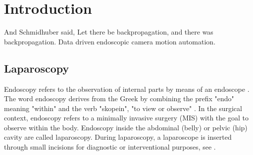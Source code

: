 \chapter[Introduction]{Introduction}
\label{chap:introduction}
And Schmidhuber said, Let there be backpropagation, and there was backpropagation.
\minitoc
Data driven endoscopic camera motion automation. 

\section{Laparoscopy}
Endoscopy refers to the observation of internal parts by means of an endoscope \cite{oedendoscopy}. The word endoscopy derives from the Greek by combining the prefix "endo" meaning "within" and the verb "skopein", "to view or observe" \cite{majumdar1993short}. In the surgical context, endoscopy refers to a minimally invasive surgery (MIS) with the goal to observe within the body. Endoscopy inside the abdominal (belly) or pelvic (hip) cavity are called laparoscopy. During laparoscopy, a laparoscope is inserted through small incisions for diagnostic or interventional purposes, see .

